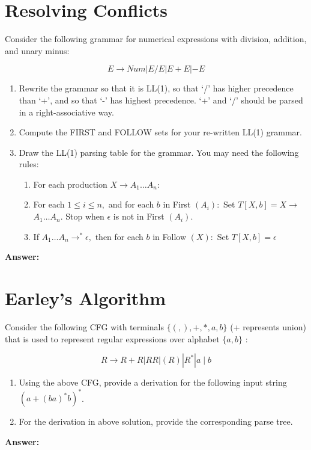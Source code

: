 \documentclass[a4paper]{article}
\theoremstyle{definition}
\begin{document}
\section{Resolving Conflicts}
Consider the following grammar for numerical expressions with division, addition, and
unary minus:

$$E → Num | E/E | E + E | − E$$

\begin{enumerate}
  \item Rewrite the grammar so that it is LL(1), so that ‘/’ has higher precedence than
  ‘+’, and so that ‘-’ has highest precedence. ‘+’ and ‘/’ should be parsed in a
  right-associative way.
  \item  Compute the FIRST and FOLLOW sets for your re-written LL(1) grammar.
  \item Draw the LL(1) parsing table for the grammar. You may need the following rules:
  \begin{enumerate}
    \item  For each production $X \rightarrow A_{1} \ldots A_{n}:$
    \item For each $1 \leq i \leq n,$ and for each $b$ in First $\left(A_{i}\right):$ Set $T[X, b]=X \rightarrow$
    $A_{1} \ldots A_{n} .$ Stop when $\epsilon$ is not in First $\left(A_{i}\right) .$
    \item If $A_{1} \ldots A_{n} \rightarrow^{*} \epsilon,$ then for each $b$ in Follow $(X):$ Set $T[X, b]=\epsilon$
  \end{enumerate}
\end{enumerate}
\textbf{Answer:}

\section{Earley's Algorithm}
Consider the following CFG with terminals $\{(,),+, *, a, b\}$ (+ represents union) that is
used to represent regular expressions over alphabet $\{a, b\}$ :

$$R \rightarrow R+R|R R|(R)\left|R^{*}\right| a \mid b$$
\begin{enumerate}
  \item Using the above CFG, provide a derivation for the following input string $\left(a+(b a)^{*} b\right)^{*}$.
  \item For the derivation in above solution, provide the corresponding parse tree.
\end{enumerate}
\textbf{Answer:}
\end{document}

